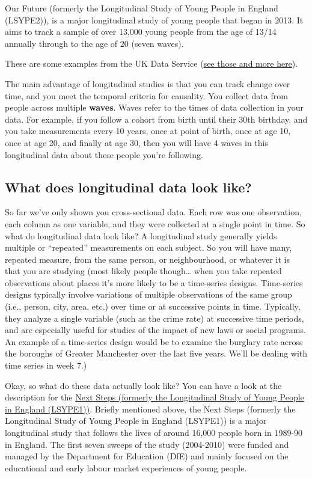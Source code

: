 \documentclass[
]{book}
\begin{document}
Our Future (formerly the Longitudinal Study of Young People in England (LSYPE2)), is a major longitudinal study of young people that began in 2013. It aims to track a sample of over 13,000 young people from the age of 13/14 annually through to the age of 20 (seven waves).

These are some examples from the UK Data Service (\href{https://www.ukdataservice.ac.uk/get-data/key-data/cohort-and-longitudinal-studies}{see those and more here}).

The main advantage of longitudinal studies is that you can track change over time, and you meet the temporal criteria for causality. You collect data from people across multiple \textbf{waves}. Waves refer to the times of data collection in your data. For example, if you follow a cohort from birth until their 30th birthday, and you take measurements every 10 years, once at point of birth, once at age 10, once at age 20, and finally at age 30, then you will have 4 waves in this longitudinal data about these people you're following.

\hypertarget{what-does-longitudinal-data-look-like}{%
\subsection{What does longitudinal data look like?}\label{what-does-longitudinal-data-look-like}}

So far we've only shown you cross-sectional data. Each row was one observation, each column as one variable, and they were collected at a single point in time. So what do longitudinal data look like?
A longitudinal study generally yields multiple or ``repeated'' measurements on each subject. So you will have many, repeated measure, from the same person, or neighbourhood, or whatever it is that you are studying (most likely people though\ldots{} when you take repeated observations about places it's more likely to be a time-series designs. Time-series designs typically involve variations of multiple observations of the same group (i.e., person, city, area, etc.) over time or at successive points in time. Typically, they analyze a single variable (such as the crime rate) at successive time periods, and are especially useful for studies of the impact of new laws or social programs. An example of a time-series design would be to examine the burglary rate across the boroughs of Greater Manchester over the last five years. We'll be dealing with time series in week 7.)

Okay, so what do these data actually look like? You can have a look at the description for the \href{https://discover.ukdataservice.ac.uk/series/?sn=2000030}{Next Steps (formerly the Longitudinal Study of Young People in England (LSYPE1))}. Briefly mentioned above, the Next Steps (formerly the Longitudinal Study of Young People in England (LSYPE1)) is a major longitudinal study that follows the lives of around 16,000 people born in 1989-90 in England. The first seven sweeps of the study (2004-2010) were funded and managed by the Department for Education (DfE) and mainly focused on the educational and early labour market experiences of young people.
\end{document}
